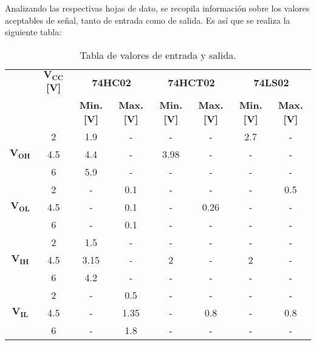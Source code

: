 Analizando las respectivas hojas de dato, se recopila información sobre los  valores aceptables de señal, tanto de entrada como de salida. Es así que se realiza la siguiente tabla:
\begin{table}[H]
\hspace*{-1.5cm}
\begin{tabular}{c|c|c|c|c|c|c|c|}
\cline{2-8}
                               & $\mathbf{V_{CC}}$ \textbf{[V]} & \multicolumn{2}{c|}{\textbf{74HC02}}  & \multicolumn{2}{c|}{\textbf{74HCT02}} & \multicolumn{2}{c|}{\textbf{74LS02}} \\ \cline{3-8} 
                               &              & \textbf{Min. [V]} & \textbf{Max. [V]} & \textbf{Min. [V]} & \textbf{Max. [V]} & \textbf{Min. [V]} & \textbf{Max. [V]}	\\ \hline
\multicolumn{1}{|c|}{}         & 2            & 1.9           & -            & -             & -            & 2.7          & -            \\  
\multicolumn{1}{|c|}{$\mathbf{V_{OH}}$} & 4.5          & 4.4           & -            & 3.98          & -            & -            & -            \\  
\multicolumn{1}{|c|}{}         & 6            & 5.9           & -            & -             & -            & -            & -            \\ \hline
\multicolumn{1}{|c|}{}         & 2            & -             & 0.1          & -             & -            & -            & 0.5          \\
\multicolumn{1}{|c|}{$\mathbf{V_{OL}}$} & 4.5          & -             & 0.1          & -             & 0.26         & -            & -            \\
\multicolumn{1}{|c|}{}         & 6            & -             & 0.1          & -             & -            & -            & -            \\ \hline
\multicolumn{1}{|c|}{}         & 2            & 1.5           & -            & -             & -            & -            & -            \\ 
\multicolumn{1}{|c|}{$\mathbf{V_{IH}}$}  & 4.5          & 3.15          & -            & 2             & -            & 2            & -            \\ 
\multicolumn{1}{|c|}{}         & 6            & 4.2           & -            & -             & -            & -            & -            \\ \hline
\multicolumn{1}{|c|}{}         & 2            & -             & 0.5          & -             & -            & -            & -            \\ 
\multicolumn{1}{|c|}{$\mathbf{V_{IL}}$} & 4.5          & -             & 1.35         & -             & 0.8          & -            & 0.8          \\ 
\multicolumn{1}{|c|}{}         & 6            & -             & 1.8          & -             & -            & -            & -            \\ \hline
\end{tabular}
\centering
\caption{Tabla de valores de entrada y salida.}
\label{tabla:vinout}
\end{table}

